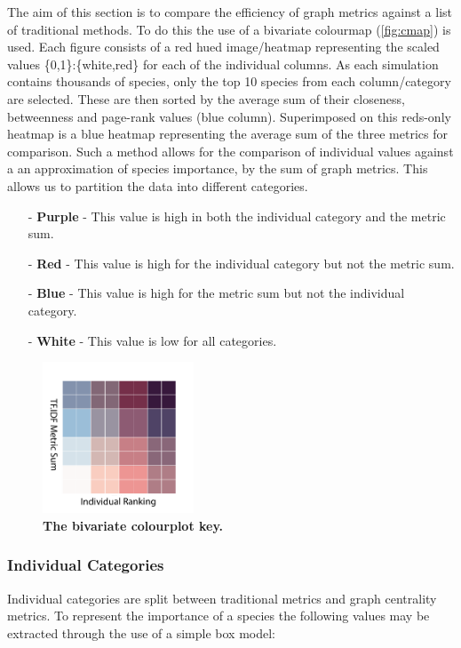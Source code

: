 The aim of this section is to compare the efficiency of graph metrics against a list of traditional methods. To do this the use of a bivariate colourmap (\autoref{fig:cmap}) is used. Each figure consists of a red hued image/heatmap representing the scaled values \{0,1\}:\{white,red\} for each of the individual columns. As each simulation contains thousands of species, only the top 10 species from each column/category are selected. These are then sorted by the average sum of their closeness, betweenness and page-rank values (blue column). Superimposed on this reds-only heatmap is a blue heatmap representing the average sum of the three metrics for comparison. Such a method allows for the comparison of individual values against a an approximation of species importance, by the sum of graph metrics. This allows us to partition the data into different categories. 

\begin{itemize}
\item[-] \textbf{Purple} - This value is high in both the individual category and the metric sum. 
\item[-] \textbf{Red} - This value is high for the individual category but not the metric sum. 
\item[-] \textbf{Blue} - This value is high for the metric sum but not the individual category. 
\item[-] \textbf{White} - This value is low for all categories. 
\end{itemize}



\begin{figure}[H]
     \centering
         \includegraphics[width=0.4\textwidth,angle=45]{figures_c3/mlpregressor/cbar.pdf}
        \caption{ \textbf{The bivariate colourplot key.} }
        \label{fig:cmap}
\end{figure}


\subsubsection{Individual Categories}
Individual categories are split between traditional metrics and graph centrality metrics. To represent the importance of a species the following values may be extracted through the use of a simple box model:

